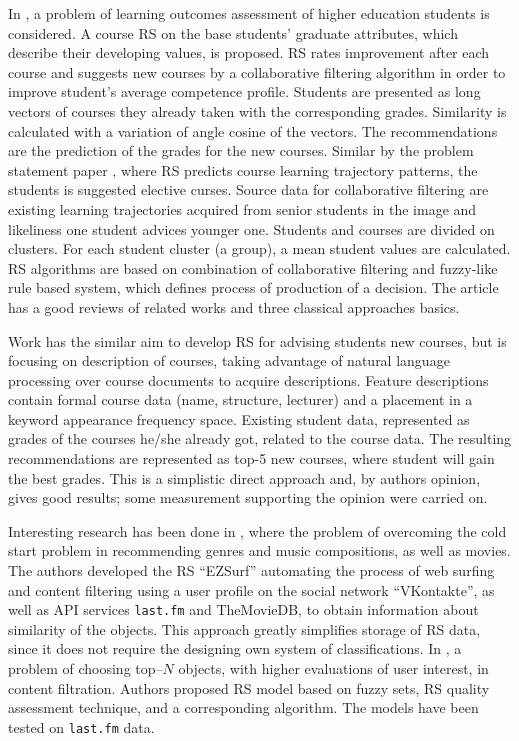 \documentclass[conference]{IEEEtran}
\begin{document}
In \cite{bakh}, a problem of learning outcomes assessment of higher education students is considered.  A course RS on the base students' graduate attributes, which describe their developing values, is proposed.  RS rates improvement after each course and suggests new courses by a collaborative filtering algorithm in order to improve student's average competence profile.  Students are presented as long vectors of courses they already taken with the corresponding grades.  Similarity is calculated with a variation of angle cosine of the vectors.  The recommendations are the prediction of the grades for the new courses.  Similar by the problem statement paper \cite{amer}, where RS predicts course learning trajectory patterns, the students is suggested elective curses.  Source data for collaborative filtering are existing learning trajectories acquired from senior students in the image and likeliness one student advices younger one. Students and courses are divided on clusters.  For each student cluster (a group), a mean student values are calculated.  RS algorithms are based on combination of collaborative filtering and fuzzy-like rule based system, which defines process of production of a decision.  The article has a good reviews of related works and three classical approaches basics.

Work \cite{naren} has the similar aim to develop RS for advising students new courses, but is focusing on description of courses, taking advantage of natural language processing over course documents to acquire descriptions.  Feature descriptions contain formal course data (name, structure, lecturer) and a placement in a keyword appearance frequency space.  Existing student data, represented as grades of the courses he/she already got, related to the course data.  The resulting recommendations are represented as top-5 new courses, where student will gain the best grades.  This is a simplistic direct approach and, by authors opinion, gives good results; some measurement supporting the opinion were carried on.



Interesting research has been done in \cite{br10}, where the problem of overcoming the cold start problem in recommending genres and music compositions, as well as movies.  The authors developed the RS ``EZSurf'' automating the process of web surfing and content filtering using a user profile on the social network ``VKontakte'', as well as API services \texttt{last.fm} and TheMovieDB, to obtain information about similarity of the objects.  This approach greatly simplifies storage of RS data, since it does not require the designing own system of classifications.  In \cite{br14}, a problem of choosing top--$N$ objects, with higher evaluations of user interest, in content filtration.  Authors proposed RS model based on fuzzy sets, RS quality assessment technique, and a corresponding algorithm.  The models have been tested on \texttt{last.fm} data.
\end{document}
